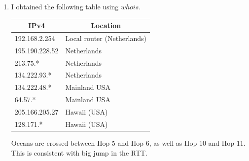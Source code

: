 \documentclass[12pt, a4paper]{article}
\begin{document}
\begin{enumerate}[a]
	\item %
	\begin{multicols}{2}
		I obtained the following table using $whois$.

		\begin{tabular}{l|p{8em}}
		\multicolumn{1}{c|}{IPv4} & \multicolumn{1}{c}{Location}\\\hline
		192.168.2.254 & Local router (Netherlands)\\
		195.190.228.52 & Netherlands\\
		213.75.* & Netherlands\\
		134.222.93.* & Netherlands\\
		134.222.48.* & Mainland USA\\
		64.57.* & Mainland USA\\
		205.166.205.27 & Hawaii (USA)\\
		128.171.* & Hawaii (USA)
		\end{tabular}

		Oceans are crossed between Hop 5 and Hop 6, as well as Hop 10 and Hop 11. This is consistent with big jump in the RTT.
	\end{multicols}
\end{enumerate}
\end{document}
